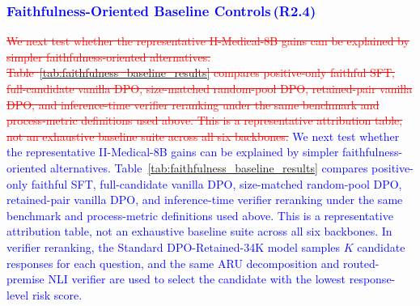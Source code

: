 \documentclass[a4paper,fleqn,doubleblind]{cas-sc}
\DeclareRobustCommand{\deleted}[1]{\textcolor{red}{\sout{#1}}}
\DeclareRobustCommand{\added}[1]{\textcolor{blue}{#1}}
\DeclareRobustCommand{\revtag}[1]{\textcolor{blue}{\scriptsize\,(\textbf{#1})}}
\begin{document}
\subsubsection{\added{Faithfulness-Oriented Baseline Controls}\revtag{R2.4}}
\deleted{We next test whether the representative II-Medical-8B gains can be explained by simpler faithfulness-oriented alternatives. Table~\ref{tab:faithfulness_baseline_results} compares positive-only faithful SFT, full-candidate vanilla DPO, size-matched random-pool DPO, retained-pair vanilla DPO, and inference-time verifier reranking under the same benchmark and process-metric definitions used above. This is a representative attribution table, not an exhaustive baseline suite across all six backbones.}
\added{We next test whether the representative II-Medical-8B gains can be explained by simpler faithfulness-oriented alternatives. Table~\ref{tab:faithfulness_baseline_results} compares positive-only faithful SFT, full-candidate vanilla DPO, size-matched random-pool DPO, retained-pair vanilla DPO, and inference-time verifier reranking under the same benchmark and process-metric definitions used above. This is a representative attribution table, not an exhaustive baseline suite across all six backbones. In verifier reranking, the Standard DPO-Retained-34K model samples $K$ candidate responses for each question, and the same ARU decomposition and routed-premise NLI verifier are used to select the candidate with the lowest response-level risk score.}
\end{document}
